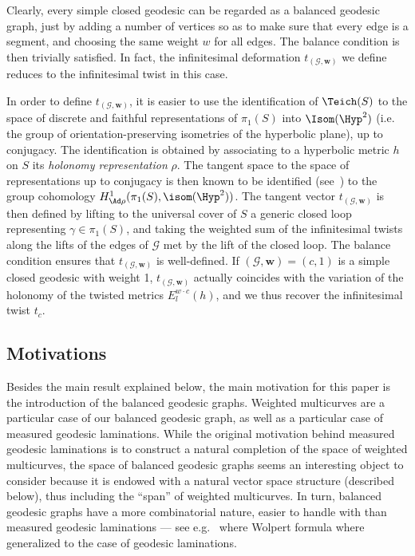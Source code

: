 Clearly, every simple closed geodesic can be regarded as a balanced geodesic graph, just by adding a number of vertices so as to make sure that every edge is a segment, and choosing the same weight $w$ for all edges. The balance condition is then trivially satisfied. In fact, the infinitesimal deformation $t_{(\mathcal G,\mathbf w)}$ we define reduces to the infinitesimal twist in this case.



In order to define $t_{(\mathcal G,\mathbf w)}$, it is easier to use the identification of $\Teich(S)$ to the space of discrete and faithful representations of $\pi_1(S)$ into $\Isom(\Hyp^2)$ (i.e. the group of orientation-preserving isometries of the hyperbolic plane), up to conjugacy. The identification is obtained by associating to a hyperbolic metric $h$ on $S$ its \emph{holonomy representation} $\rho$. The tangent space to the space of representations up to conjugacy is then known to be identified (see~\cite{Goldman}) to the group cohomology $H^1_{\Ad\rho}(\pi_1(S),\isom(\Hyp^2))$. The tangent vector $t_{(\mathcal G,\mathbf w)}$ is then defined by lifting to the universal cover of $S$ a generic closed loop representing $\gamma\in\pi_1(S)$, and taking the weighted sum of the infinitesimal twists along the lifts of the edges of $\mathcal G$ met by the lift of the closed loop. The balance condition ensures that $t_{(\mathcal G,\mathbf w)}$ is well-defined. If $(\mathcal G,\mathbf w)=(c,1)$ is a simple closed geodesic with weight 1, $t_{(\mathcal G,\mathbf w)}$ actually coincides with the variation of the holonomy of the twisted metrics $E_l^{w\cdot c}(h)$, and we thus recover the infinitesimal twist $t_c$.

\subsection{Motivations}

Besides the main result explained below, the main motivation for this paper is the introduction of the balanced geodesic graphs. Weighted multicurves are a particular case of our balanced geodesic graph, as well as a particular case of measured geodesic laminations. While the original motivation behind measured geodesic laminations is to construct a natural completion of the space of weighted multicurves, the space of balanced geodesic graphs seems an interesting object to consider because it is endowed with a natural vector space structure (described below), thus including the ``span'' of weighted multicurves. In turn, balanced geodesic graphs have a more combinatorial nature, easier to handle with than measured geodesic laminations --- see e.g.~\cite{SB} where Wolpert formula where generalized to the case of geodesic laminations.

